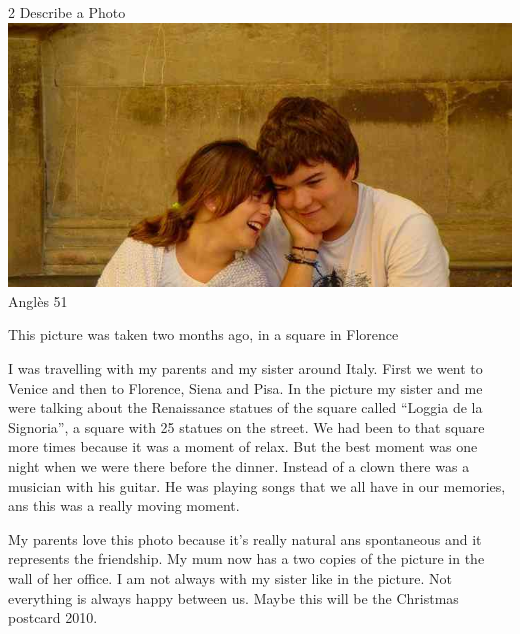 %
%
\begin{news}
{2} %
{Describe a Photo}
{\noindent\includegraphics[width=18cm,keepaspectratio]{angles/img/gen/foto_esteve_dpi_lowres.jpg}}
{Anglès}
{51} %


This picture was taken two months ago, in a square in Florence

I was travelling with my parents and my sister around Italy. First we went to Venice and then to Florence, Siena and Pisa. In the picture my sister and me were talking about the Renaissance statues of the square called “Loggia de la Signoria”, a square with 25 statues on the street. We had been to that square more times because it was a moment of relax. But the best moment was one night when we were there before the dinner. Instead of a clown there was a musician with his guitar. He was playing songs that we all have in our memories, ans this was a really moving moment.

My parents love this photo because it's really natural ans spontaneous and it represents the friendship. My mum now has a two copies of the picture in the wall of her office. I am not always with my sister like in the picture. Not everything is always happy between us. Maybe this will be the Christmas postcard 2010.



\end{news}
